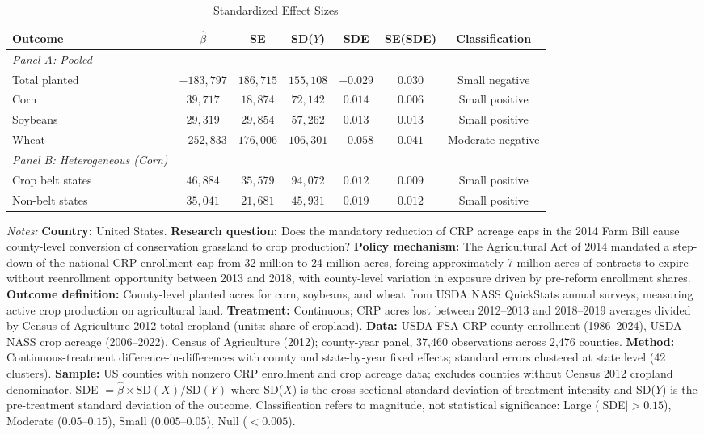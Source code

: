\begin{table}[t]
\centering
\caption{Standardized Effect Sizes}
\label{tab:sde}
\begin{adjustbox}{max width=\textwidth}
\begin{tabular}{lcccccc}
\hline\hline
Outcome & $\hat{\beta}$ & SE & SD($Y$) & SDE & SE(SDE) & Classification \\
\hline
\emph{Panel A: Pooled} \\
  Total planted & $-183,797$ & $186,715$ & $155,108$ & $-0.029$ & $0.030$ & Small negative \\
  Corn & $39,717$ & $18,874$ & $72,142$ & $0.014$ & $0.006$ & Small positive \\
  Soybeans & $29,319$ & $29,854$ & $57,262$ & $0.013$ & $0.013$ & Small positive \\
  Wheat & $-252,833$ & $176,006$ & $106,301$ & $-0.058$ & $0.041$ & Moderate negative \\
\hline
\emph{Panel B: Heterogeneous (Corn)} \\
  Crop belt states & $46,884$ & $35,579$ & $94,072$ & $0.012$ & $0.009$ & Small positive \\
  Non-belt states & $35,041$ & $21,681$ & $45,931$ & $0.019$ & $0.012$ & Small positive \\
\hline\hline
\end{tabular}
\end{adjustbox}
\begin{tablenotes}[flushleft]\small
\item \textit{Notes:} \textbf{Country:} United States. \textbf{Research question:} Does the mandatory reduction of CRP acreage caps in the 2014 Farm Bill cause county-level conversion of conservation grassland to crop production? \textbf{Policy mechanism:} The Agricultural Act of 2014 mandated a step-down of the national CRP enrollment cap from 32 million to 24 million acres, forcing approximately 7 million acres of contracts to expire without reenrollment opportunity between 2013 and 2018, with county-level variation in exposure driven by pre-reform enrollment shares. \textbf{Outcome definition:} County-level planted acres for corn, soybeans, and wheat from USDA NASS QuickStats annual surveys, measuring active crop production on agricultural land. \textbf{Treatment:} Continuous; CRP acres lost between 2012--2013 and 2018--2019 averages divided by Census of Agriculture 2012 total cropland (units: share of cropland). \textbf{Data:} USDA FSA CRP county enrollment (1986--2024), USDA NASS crop acreage (2006--2022), Census of Agriculture (2012); county-year panel, 37,460 observations across 2,476 counties. \textbf{Method:} Continuous-treatment difference-in-differences with county and state-by-year fixed effects; standard errors clustered at state level (42 clusters). \textbf{Sample:} US counties with nonzero CRP enrollment and crop acreage data; excludes counties without Census 2012 cropland denominator. SDE $= \hat{\beta} \times \text{SD}(X) / \text{SD}(Y)$ where SD($X$) is the cross-sectional standard deviation of treatment intensity and SD($Y$) is the pre-treatment standard deviation of the outcome. Classification refers to magnitude, not statistical significance: Large ($|$SDE$| > 0.15$), Moderate ($0.05$--$0.15$), Small ($0.005$--$0.05$), Null ($< 0.005$).

\end{tablenotes}
\end{table}
